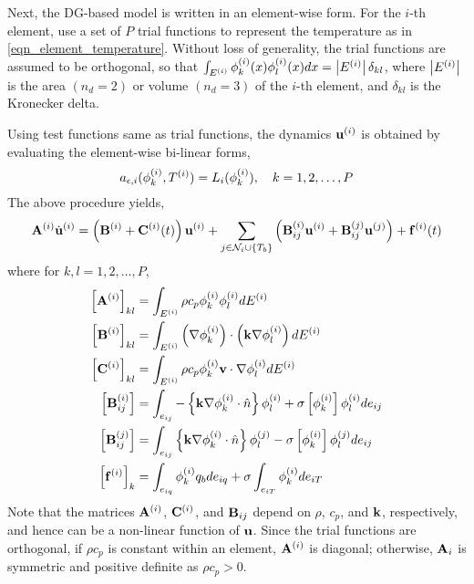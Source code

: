 Next, the DG-based model is written in an element-wise form. For the $i$-th element, use a set of $P$ trial functions to represent the temperature as in \cref{eqn_element_temperature}. Without loss of generality, the trial functions are assumed to be orthogonal, so that $\int_{E^{(i)}} \phi^{(i)}_k(x) \phi^{(i)}_l(x) dx = \left|E^{(i)}\right|\delta_{kl}$, where $\left|E^{(i)}\right|$ is the area $(n_d=2)$ or volume $(n_d=3)$ of the $i$-th element, and $\delta_{kl}$ is the Kronecker delta. 

Using test functions same as trial functions, the dynamics $\mathbf{u}^{(i)}$ is obtained by evaluating the element-wise bi-linear forms,
\begin{equation}
    a_{\epsilon,i}(\phi_k^{(i)},T^{(i)}) = L_i(\phi_k^{(i)}),\quad k=1,2,\dots,P
\end{equation}
The above procedure yields,
\begin{equation}
    \mathbf{A}^{(i)}\dot{\mathbf{u}}^{(i)} = \left(\mathbf{B}^{(i)} + \mathbf{C}^{(i)}(t)\right)\mathbf{u}^{(i)} + \sum_{j\in\mathcal{N}_i\cup\left\{T_b\right\}}\left(\mathbf{B}^{(i)}_{ij}\mathbf{u}^{(i)} + \mathbf{B}^{(j)}_{ij}\mathbf{u}^{(j)}\right) + \mathbf{f}^{(i)}(t)\label{eqn_element_wise_model}
\end{equation}
where for $k,l=1,2,\dots,P$,
\begin{subequations}
    \begin{align}
        \left[\mathbf{A}^{(i)}\right]_{kl} &= \int_{E^{(i)}}\rho c_p\phi_k^{(i)}\phi_l^{(i)}dE^{(i)}\\
        \left[\mathbf{B}^{(i)}\right]_{kl} &= \int_{E^{(i)}}\left(\nabla\phi_k^{(i)}\right)\cdot\left(\mathbf{k}\nabla\phi_l^{(i)}\right)dE^{(i)}\\
        \left[\mathbf{C}^{(i)}\right]_{kl} &= \int_{E^{(i)}}\rho c_p \phi_k^{(i)}\mathbf{v}\cdot\nabla\phi_l^{(i)}dE^{(i)}\\
        \left[\mathbf{B}^{(i)}_{ij}\right] &= \int_{e_{ij}}-\left\{\mathbf{k}\nabla\phi_k^{(i)}\cdot\hat{n}\right\}\phi_l^{(i)} + \sigma\left[\phi_k^{(i)}\right]\phi_l^{(i)}de_{ij}\\
        \left[\mathbf{B}^{(j)}_{ij}\right] &= \int_{e_{ij}}\left\{\mathbf{k}\nabla\phi_k^{(i)}\cdot\hat{n}\right\}\phi_l^{(j)} - \sigma\left[\phi_k^{(i)}\right]\phi_l^{(j)}de_{ij}\\
        \left[\mathbf{f}^{(i)}\right]_k &= \int_{e_{iq}}\phi_k^{(i)}q_bde_{iq} + \sigma\int_{e_{iT}}\phi_k^{(i)}de_{iT}
    \end{align}
\end{subequations}
Note that the matrices $\mathbf{A}^{(i)}$, $\mathbf{C}^{(i)}$, and $\mathbf{B}_{ij}$ depend on $\rho$, $c_p$, and $\mathbf{k}$, respectively, and hence can be a non-linear function of $\mathbf{u}$. Since the trial functions are orthogonal, if $\rho c_p$ is constant within an element, $\mathbf{A}^{(i)}$ is diagonal; otherwise, $\mathbf{A}_i$ is symmetric and positive definite as $\rho c_p > 0$.

